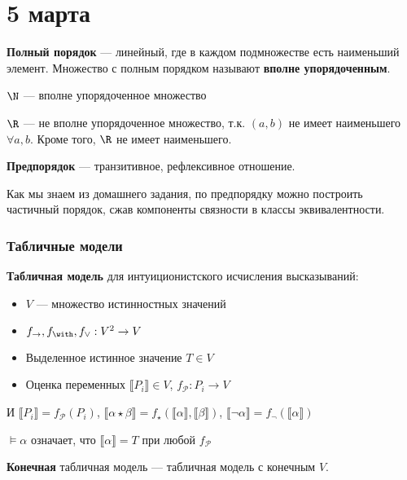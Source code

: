 \chapter{5 марта}

\begin{definition}
    \textbf{Полный порядок} --- линейный, где в каждом подмножестве есть наименьший элемент. Множество с полным порядком называют \textbf{вполне упорядоченным}.
\end{definition}
\begin{example}
    \(\N\) --- вполне упорядоченное множество

    \(\R\) --- не вполне упорядоченное множество, т.к. \((a, b)\) не имеет наименьшего \(\forall a, b\). Кроме того, \(\R\) не имеет наименьшего.
\end{example}
\begin{definition}
    \textbf{Предпорядок} --- транзитивное, рефлексивное отношение.
\end{definition}

Как мы знаем из домашнего задания, по предпорядку можно построить частичный порядок, сжав компоненты связности в классы эквивалентности.

\subsection{Табличные модели}

\begin{definition}
    \textbf{Табличная модель} для интуиционистского исчисления высказываний:
    \begin{itemize}
        \item \(V\) --- множество истинностных значений
        \item \(f_\to, f_\with, f_\lor : V^2 \to V\)
        \item Выделенное истинное значение \(T\in V\)
        \item Оценка переменных \(\llbracket P_i \rrbracket \in V\), \(f_{\mathcal{P}} : P_i \to V\)
    \end{itemize}
    И \(\llbracket P_i \rrbracket = f_{\mathcal{P}}(P_i)\), \(\llbracket \alpha \star \beta \rrbracket = f_\star(\llbracket \alpha \rrbracket, \llbracket \beta \rrbracket)\), \(\llbracket \neg \alpha \rrbracket = f_\neg(\llbracket \alpha \rrbracket)\)

    \(\models \alpha\) означает, что \(\llbracket \alpha \rrbracket = T\) при любой \(f_{\mathcal{P}}\)
\end{definition}
\begin{definition}
    \textbf{Конечная} табличная модель --- табличная модель с конечным \(V\).
\end{definition}

